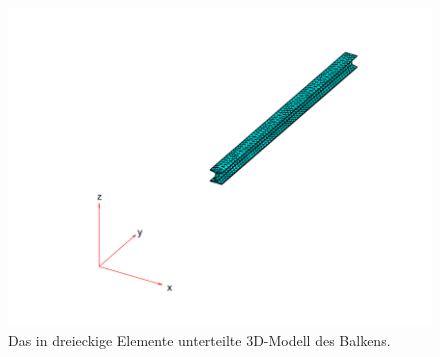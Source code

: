%
%
%
\begin{figure}
    \centering
    \includegraphics[width=\textwidth]{papers/fem/images/balken_mesh.pdf}
    \caption{Das in dreieckige Elemente unterteilte 3D-Modell des Balkens.}
    \label{fem:anw:mesh}
    \end{figure}
    